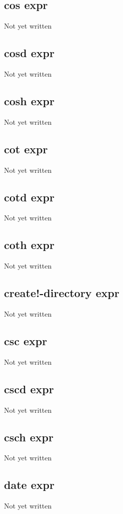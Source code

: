 \documentclass[a4paper,11pt]{article}
\begin{document}
\subsection{\ttfamily cos expr}
Not yet written

\subsection{\ttfamily cosd expr}
Not yet written

\subsection{\ttfamily cosh expr}
Not yet written

\subsection{\ttfamily cot expr}
Not yet written

\subsection{\ttfamily cotd expr}
Not yet written

\subsection{\ttfamily coth expr}
Not yet written

\subsection{\ttfamily create!-directory expr}
Not yet written

\subsection{\ttfamily csc expr}
Not yet written

\subsection{\ttfamily cscd expr}
Not yet written

\subsection{\ttfamily csch expr}
Not yet written

\subsection{\ttfamily date expr}
Not yet written
\end{document}

